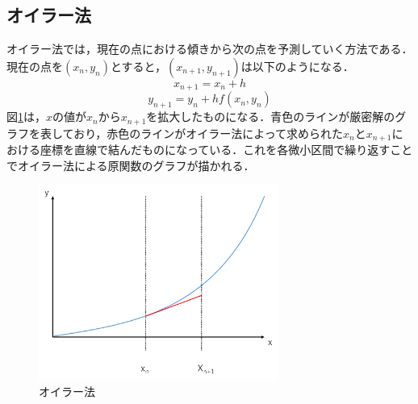 \documentclass[a4paper, 12pt]{ltjsarticle}
\begin{document}
\subsection{オイラー法}
オイラー法では，現在の点における傾きから次の点を予測していく方法である．現在の点を$(x_n,y_n)$とすると，$(x_{n+1},y_{n+1})$は以下のようになる．
\begin{equation}
  x_{n+1}=x_n+h
\end{equation}
\begin{equation}
  y_{n+1}=y_n+hf(x_n,y_n)
\end{equation}
図\ref{fig:オイラー法}は，$x$の値が$x_n$から$x_{n+1}$を拡大したものになる．青色のラインが厳密解のグラフを表しており，赤色のラインがオイラー法によって求められた$x_n$と$x_{n+1}$における座標を直線で結んだものになっている．これを各微小区間で繰り返すことでオイラー法による原関数のグラフが描かれる．
\begin{figure}[h]
\begin{center}
\includegraphics[clip,width=0.7\textwidth,keepaspectratio]{euler.pdf}
\end{center}
\caption{オイラー法}
\label{fig:オイラー法}
\end{figure}
\clearpage
\end{document}
